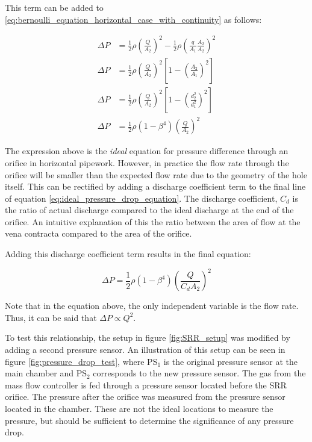 \newpage
This term can be added to \ref{eq:bernoulli_equation_horizontal_case_with_continuity} as follows:

\begin{equation}
\begin{aligned} 
\Delta P &= \frac{1}{2} \rho \left (\frac{Q}{A_2} \right )^2 - \frac{1}{2} \rho \left (\frac{q}{A_1} \frac{A_2}{A_2} \right )^2 \\ 
\Delta P &= \frac{1}{2} \rho \left (\frac{Q}{A_2} \right )^2  \left [1 - \left( \frac{A_2}{A_1} \right )^2 \right ] \\
\Delta P &= \frac{1}{2} \rho \left (\frac{Q}{A_2} \right )^2  \left [1 - \left( \frac{d_2^2}{d_1^2} \right )^2 \right ] \\
\Delta P &= \frac{1}{2} \rho \left (1 - \beta^4 \right )  \left (\frac{Q}{A_2} \right )^2 
\end{aligned}
\label{eq:ideal_pressure_drop_equation}
\end{equation}

The expression above is the \textit{ideal} equation for pressure difference through an orifice in horizontal pipework. However, in practice the flow rate through the orifice will be smaller than the expected flow rate due to the geometry of the hole itself. This can be rectified by adding a discharge coefficient term to the final line of equation \ref{eq:ideal_pressure_drop_equation}. The discharge coefficient, $C_d$ is the ratio of actual discharge compared to the ideal discharge at the end of the orifice. An intuitive explanation of this the ratio between the area of flow at the vena contracta compared to the area of the orifice. 

Adding this discharge coefficient term results in the final equation:

 \begin{equation}
    \Delta P = \frac{1}{2} \rho \left (1 - \beta^4 \right )  \left (\frac{Q}{C_d A_2} \right )^2
    \label{eq:better_ideal_pressure_drop_equation}
\end{equation}

Note that in the equation above, the only independent variable is the flow rate. Thus, it can be said that $\Delta P \propto Q^2$. 

To test this relationship, the setup in figure \ref{fig:SRR_setup} was modified by adding a second pressure sensor. An illustration of this setup can be seen in figure \ref{fig:pressure_drop_test}, where PS$_1$ is the original pressure sensor at the main chamber and PS$_2$ corresponds to the new pressure sensor. The gas from the mass flow controller is fed through a pressure sensor located before the SRR orifice. The pressure after the orifice was measured from the pressure sensor located in the chamber. These are not the ideal locations to measure the pressure, but should be sufficient to determine the significance of any pressure drop.

